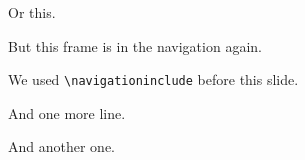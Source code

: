 \documentclass[]{beamer}
\begin{document}
\begin{frame}
	Or this.
\end{frame}

\navigationinclude
\begin{frame}
	But this frame is in the navigation again.
	
	We used \texttt{\textbackslash navigationinclude} before this slide.
\end{frame}

\begin{frame}
\vspace*{\baselineskip}
\lipsum[2-3][1-20]
 
And one more line.
	
And another one.
\end{frame}
\end{document}
